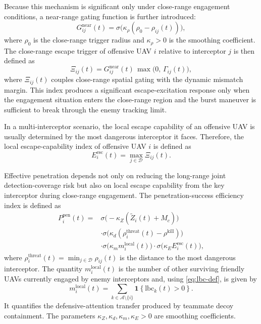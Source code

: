 \documentclass{cja}
\begin{document}
Because this mechanism is significant only under close-range engagement conditions, a near-range gating function is further introduced:
\begin{equation}
G_{ij}^{\mathrm{near}}(t)
=
\sigma\!\bigl(\kappa_{\rho}(\rho_0-\rho_{ij}(t))\bigr),
\end{equation}
where $\rho_0$ is the close-range trigger radius and $\kappa_{\rho}>0$ is the smoothing coefficient. The close-range escape trigger of offensive UAV $i$ relative to interceptor $j$ is then defined as
\begin{equation}
\Xi_{ij}(t)
=
G_{ij}^{\mathrm{near}}(t)\,\max\bigl(0,\, \Gamma_{ij}(t)\bigr),
\end{equation}
where $\Xi_{ij}(t)$ couples close-range spatial gating with the dynamic mismatch margin. This index produces a significant escape-excitation response only when the engagement situation enters the close-range region and the burst maneuver is sufficient to break through the enemy tracking limit.

In a multi-interceptor scenario, the local escape capability of an offensive UAV is usually determined by the most dangerous interceptor it faces. Therefore, the local escape-capability index of offensive UAV $i$ is defined as
\begin{equation}
E_i^{\mathrm{esc}}(t)
=
\max_{j\in\mathcal{D}} \Xi_{ij}(t).
\end{equation}

Effective penetration depends not only on reducing the long-range joint detection-coverage risk but also on local escape capability from the key interceptor during close-range engagement. The penetration-success efficiency index is defined as
\begin{equation}
\begin{aligned}
P_i^{\mathrm{pen}}(t)
={}&
\sigma\!\bigl(-\kappa_Z(\widetilde Z_i(t)+M_c)\bigr)\\
&\cdot
\sigma\!\bigl(\kappa_d(\rho_i^{\mathrm{threat}}(t)-\rho^{\mathrm{kill}})\bigr)\\
&\cdot
\sigma\!\bigl(\kappa_m m_i^{\mathrm{local}}(t)\bigr)
\cdot
\sigma\!\bigl(\kappa_E E_i^{\mathrm{esc}}(t)\bigr),
\end{aligned}
\label{eq:P_pen_def}
\end{equation}
where $\rho_i^{\mathrm{threat}}(t)=\min_{j\in\mathcal{D}}\rho_{ij}(t)$ is the distance to the most dangerous interceptor. The quantity $m_i^{\mathrm{local}}(t)$ is the number of other surviving friendly UAVs currently engaged by enemy interceptors and, using \eqref{eq:lbc-def}, is given by
\begin{equation*}
m_i^{\mathrm{local}}(t)
=\sum_{k\in\mathcal{A}\setminus\{i\}}
\mathbf{1}\!\left\{\mathrm{lbc}_k(t)>0\right\}.
\end{equation*}
It quantifies the defensive-attention transfer produced by teammate decoy containment. The parameters $\kappa_Z,\kappa_d,\kappa_m,\kappa_E>0$ are smoothing coefficients.
\end{document}
